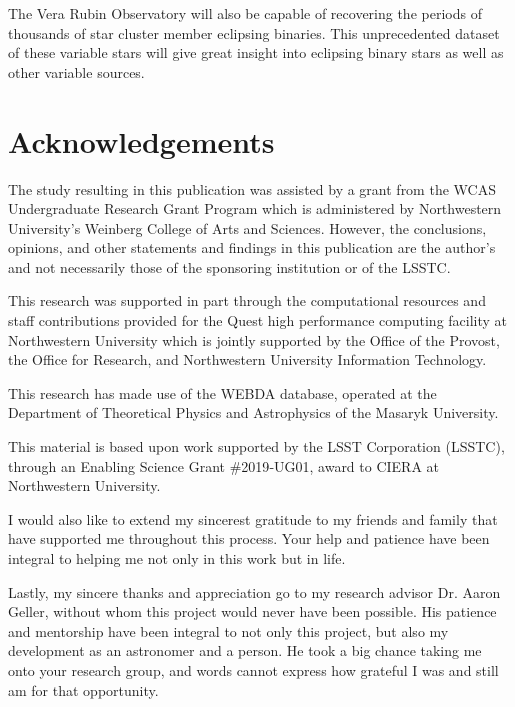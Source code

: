\documentclass[twocolumn]{aastex63}
\begin{document}
The Vera Rubin Observatory will also be capable of recovering the periods of thousands of star cluster member eclipsing binaries. This unprecedented dataset of these variable stars will give great insight into eclipsing binary stars as well as other variable sources.


\section{Acknowledgements}
The study resulting in this publication was assisted by a grant from the WCAS Undergraduate Research Grant Program which is administered by Northwestern University's Weinberg College of Arts and Sciences. However, the conclusions, opinions, and other statements and findings in this publication are the author's and not necessarily those of the sponsoring institution or of the LSSTC.

This research was supported in part through the computational resources and staff contributions provided for the Quest high performance computing facility at Northwestern University which is jointly supported by the Office of the Provost, the Office for Research, and Northwestern University Information Technology.

This research has made use of the WEBDA database, operated at the Department of Theoretical Physics and Astrophysics of the Masaryk University. 

This material is based upon work supported by the LSST Corporation (LSSTC), through an Enabling Science Grant \#2019‐UG01, award to CIERA at Northwestern University.

I would also like to extend my sincerest gratitude to my friends and family that have supported me throughout this process. Your help and patience have been integral to helping me not only in this work but in life.

Lastly, my sincere thanks and appreciation go to my research advisor Dr. Aaron Geller, without whom this project would never have been possible. His patience and mentorship have been integral to not only this project, but also my development as an astronomer and a person. He took a big chance taking me onto your research group, and words cannot express how grateful I was and still am for that opportunity.


% 
%
\end{document}
